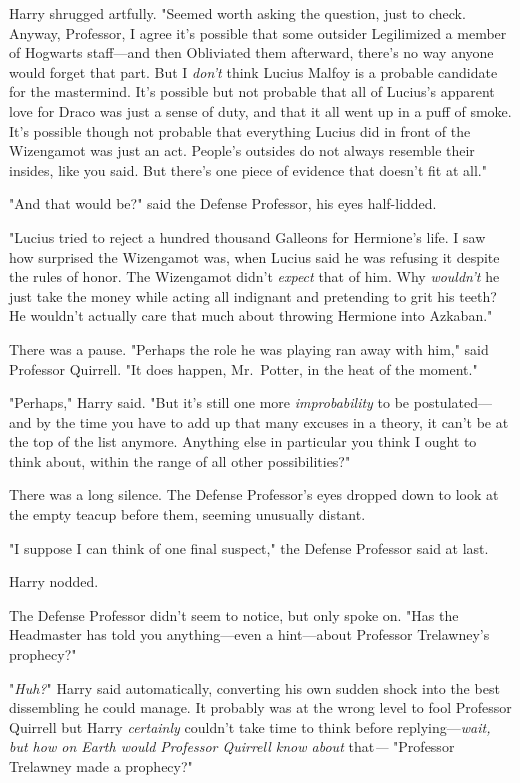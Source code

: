 Harry shrugged artfully. "Seemed worth asking the question, just to check.
Anyway, Professor, I agree it's possible that some outsider Legilimized a
member of Hogwarts staff---and then Obliviated them afterward, there's no way
anyone would forget that part. But I \emph{don't} think Lucius Malfoy is a
probable candidate for the mastermind. It's possible but not probable that all
of Lucius's apparent love for Draco was just a sense of duty, and that it all
went up in a puff of smoke. It's possible though not probable that everything
Lucius did in front of the Wizengamot was just an act. People's outsides do not
always resemble their insides, like you said. But there's one piece of evidence
that doesn't fit at all."

"And that would be?" said the Defense Professor, his eyes half-lidded.

"Lucius tried to reject a hundred thousand Galleons for Hermione's life. I saw
how surprised the Wizengamot was, when Lucius said he was refusing it despite
the rules of honor. The Wizengamot didn't \emph{expect} that of him. Why
\emph{wouldn't} he just take the money while acting all indignant and
pretending to grit his teeth? He wouldn't actually care that much about
throwing Hermione into Azkaban."

There was a pause. "Perhaps the role he was playing ran away with him," said
Professor Quirrell. "It does happen, Mr.~Potter, in the heat of the moment."

"Perhaps," Harry said. "But it's still one more \emph{improbability} to be
postulated---and by the time you have to add up that many excuses in a theory,
it can't be at the top of the list anymore. Anything else in particular you
think I ought to think about, within the range of all other possibilities?"

There was a long silence. The Defense Professor's eyes dropped down to look at
the empty teacup before them, seeming unusually distant.

"I suppose I can think of one final suspect," the Defense Professor said at
last.

Harry nodded.

The Defense Professor didn't seem to notice, but only spoke on. "Has the
Headmaster has told you anything---even a hint---about Professor Trelawney's
prophecy?"

"\emph{Huh?}" Harry said automatically, converting his own sudden shock into
the best dissembling he could manage. It probably was at the wrong level to
fool Professor Quirrell but Harry \emph{certainly} couldn't take time to think
before replying---\emph{wait, but how on Earth would Professor Quirrell know
about} that\emph{---} "Professor Trelawney made a prophecy?"


